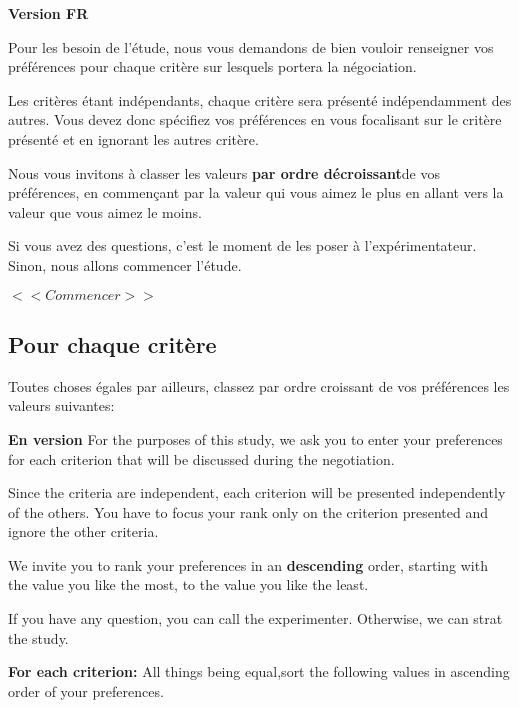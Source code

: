 \documentclass [french]{paper}
\begin{document}
				\textbf{Version FR}
				
				
				Pour les besoin de l'étude, nous vous demandons de bien vouloir renseigner vos préférences pour chaque critère sur lesquels portera la négociation.
				
				Les critères étant indépendants, chaque critère sera présenté indépendamment des autres. Vous devez donc spécifiez vos préférences en vous focalisant sur le critère présenté et en ignorant les autres critère.
				
				Nous vous invitons à classer les valeurs \textbf{par ordre décroissant}de vos préférences, en commençant par la valeur qui vous aimez le plus en allant vers la valeur que vous aimez le moins.
				
			 Si vous avez des questions, c'est le moment de les poser à l'expérimentateur. Sinon, nous allons commencer l'étude.
				
				$<<Commencer>>$
				
	
		\subsection{Pour chaque critère}
			Toutes choses égales par ailleurs, classez par ordre croissant de vos préférences les valeurs suivantes: 
		

			
			\textbf{En version}
			For the purposes of this study, we ask you to enter your preferences for each criterion that will be discussed during the negotiation.
			
			Since the criteria are independent, each criterion will be presented independently of the others. You have to focus your rank only on the criterion presented and ignore the other criteria.
			
			We invite you to rank your preferences in an \textbf {descending} order, starting with the value you like the most,  to the value you like the least.
			
			If you have any question, you can call the experimenter. Otherwise, we can strat the study.
		
			
				\textbf{For each criterion:}  All things being equal,sort the following values in ascending order of your preferences.
		
	
\end{document}
